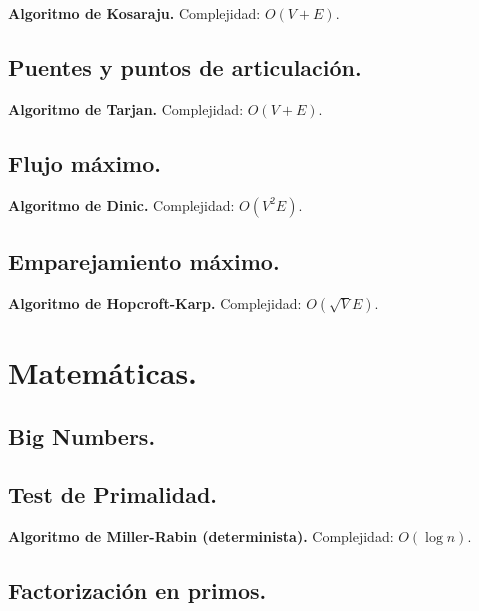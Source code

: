 \documentclass[10pt, letterpaper, twoside]{article}
\begin{document}
\textbf{Algoritmo de Kosaraju.} Complejidad: $O(V + E)$.



\subsection{Puentes y puntos de articulación.}

\textbf{Algoritmo de Tarjan.} Complejidad: $O(V + E)$.



\subsection{Flujo máximo.}

\textbf{Algoritmo de Dinic.} Complejidad: $O(V^2 E)$.



\subsection{Emparejamiento máximo.}

\textbf{Algoritmo de Hopcroft-Karp.} Complejidad: $O(\sqrt{V}E)$.




\section{Matemáticas.}

\subsection{Big Numbers.}



\subsection{Test de Primalidad.}

\textbf{Algoritmo de Miller-Rabin (determinista).} Complejidad: $O(\log n)$.

 

\subsection{Factorización en primos.}
\end{document}
